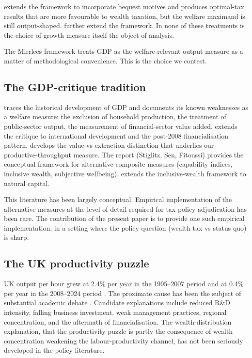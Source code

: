 \documentclass[11pt]{article}
\begin{document}
\citet{piketty2013theory} extends the framework to incorporate
bequest motives and produces optimal-tax results that are more
favourable to wealth taxation, but the welfare maximand is still
output-shaped.  \citet{saez2018social, farhi2010progressive}
further extend the framework.  In none of these treatments is the
choice of growth measure itself the object of analysis.

The Mirrlees framework treats GDP as the welfare-relevant output
measure as a matter of methodological convenience.  This is the
choice we contest.

\subsection{The GDP-critique tradition}

\citet{coyle2014gdp} traces the historical development of GDP and
documents its known weaknesses as a welfare measure: the exclusion
of household production, the treatment of public-sector output, the
measurement of financial-sector value added.
\citet{pilling2018growth} extends the critique to international
development and the post-2008 financialisation pattern.
\citet{mazzucato2018value} develops the value-vs-extraction
distinction that underlies our productive-throughput measure.  The
\citet{stiglitz2009commission} report (Stiglitz, Sen, Fitoussi)
provides the conceptual framework for alternative composite measures
(capability indices, inclusive wealth, subjective wellbeing).
\citet{dasgupta2021biodiversity} extends the inclusive-wealth
framework to natural capital.

This literature has been largely conceptual.  Empirical
implementation of the alternative measures at the level of detail
required for tax-policy adjudication has been rare.  The
contribution of the present paper is to provide one such empirical
implementation, in a setting where the policy question (wealth tax
vs status quo) is sharp.

\subsection{The UK productivity puzzle}

UK output per hour grew at 2.4\% per year in the 1995--2007 period
and at 0.4\% per year in the 2008--2024 period
\citep{ons2024productivity}.  The proximate cause has been the
subject of substantial academic debate
\citep{atkinson2020productivity}.  Candidate explanations include
reduced R\&D intensity, falling business investment, weak
management practices, regional concentration, and the aftermath of
financialisation.  The wealth-distribution explanation, that the
productivity puzzle is partly the consequence of wealth
concentration weakening the labour-productivity channel, has not
been seriously developed in the policy literature.
\end{document}
